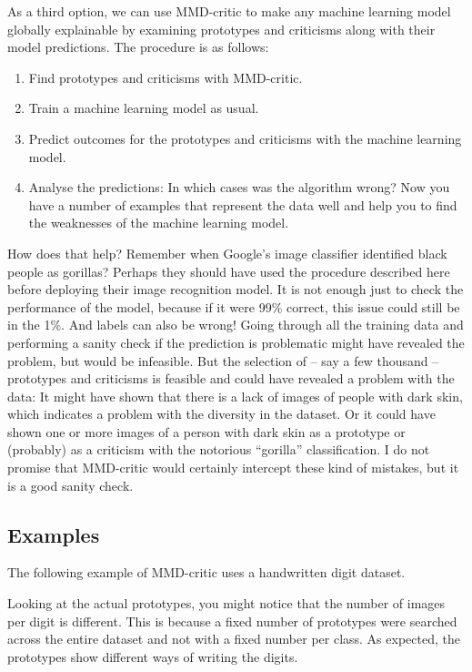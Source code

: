 \documentclass[
  12pt,
]{krantz}
\providecommand{\tightlist}{%
  \setlength{\itemsep}{0pt}\setlength{\parskip}{0pt}}
\begin{document}
As a third option, we can use MMD-critic to make any machine learning model globally explainable by examining prototypes and criticisms along with their model predictions.
The procedure is as follows:

\begin{enumerate}
\def\labelenumi{\arabic{enumi}.}
\tightlist
\item
  Find prototypes and criticisms with MMD-critic.
\item
  Train a machine learning model as usual.
\item
  Predict outcomes for the prototypes and criticisms with the machine learning model.
\item
  Analyse the predictions: In which cases was the algorithm wrong?
  Now you have a number of examples that represent the data well and help you to find the weaknesses of the machine learning model.
\end{enumerate}

How does that help?
Remember when Google's image classifier identified black people as gorillas?
Perhaps they should have used the procedure described here before deploying their image recognition model.
It is not enough just to check the performance of the model, because if it were 99\% correct, this issue could still be in the 1\%.
And labels can also be wrong!
Going through all the training data and performing a sanity check if the prediction is problematic might have revealed the problem, but would be infeasible.
But the selection of -- say a few thousand -- prototypes and criticisms is feasible and could have revealed a problem with the data:
It might have shown that there is a lack of images of people with dark skin, which indicates a problem with the diversity in the dataset.
Or it could have shown one or more images of a person with dark skin as a prototype or (probably) as a criticism with the notorious ``gorilla'' classification.
I do not promise that MMD-critic would certainly intercept these kind of mistakes, but it is a good sanity check.

\hypertarget{examples-3}{%
\subsection{Examples}\label{examples-3}}

The following example of MMD-critic uses a handwritten digit dataset.

Looking at the actual prototypes, you might notice that the number of images per digit is different.
This is because a fixed number of prototypes were searched across the entire dataset and not with a fixed number per class.
As expected, the prototypes show different ways of writing the digits.
\end{document}
